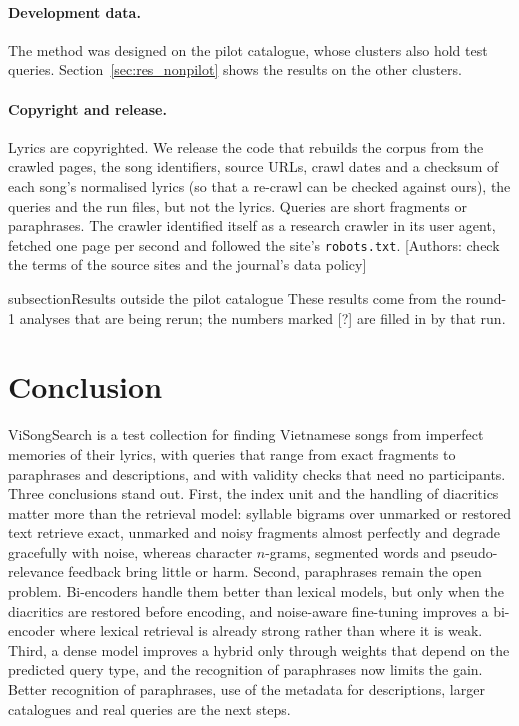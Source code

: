 \documentclass[11pt]{article}
\newcommand{\pending}[1]{\textcolor{pendingcolor}{\textsf{\small[#1]}}}
\newcommand{\authornote}[1]{\textcolor{blue!55!black}{\textsf{\small[Authors: #1]}}}
\begin{document}
\paragraph{Development data.} The method was designed on the pilot catalogue, whose clusters also hold test
queries. Section~\ref{sec:res_nonpilot} shows the results on the other clusters.

\paragraph{Copyright and release.} Lyrics are copyrighted. We release the code that rebuilds the corpus from
the crawled pages, the song identifiers, source URLs, crawl dates and a checksum of each song's normalised
lyrics (so that a re-crawl can be checked against ours), the queries and the run files, but not the lyrics.
Queries are short fragments or paraphrases. The crawler identified itself as a research crawler in its user
agent, fetched one page per second and followed the site's \texttt{robots.txt}. \authornote{check the terms of
the source sites and the journal's data policy}

subsection{Results outside the pilot catalogue}\label{sec:res_nonpilot}
These results come from the round-1 analyses that are being rerun; the numbers marked \pending{?} are filled in by that run.

\section{Conclusion}
ViSongSearch is a test collection for finding Vietnamese songs from imperfect memories of their lyrics, with
queries that range from exact fragments to paraphrases and descriptions, and with validity checks that need
no participants. Three conclusions stand out. First, the index unit and the handling of diacritics matter
more than the retrieval model: syllable bigrams over unmarked or restored text retrieve exact, unmarked and
noisy fragments almost perfectly and degrade gracefully with noise, whereas character $n$-grams, segmented
words and pseudo-relevance feedback bring little or harm. Second, paraphrases remain the open problem.
Bi-encoders handle them better than lexical models, but only when the diacritics are restored before
encoding, and noise-aware fine-tuning improves a bi-encoder where lexical retrieval is already strong rather
than where it is weak. Third, a dense model improves a hybrid only through weights that depend on the
predicted query type, and the recognition of paraphrases now limits the gain. Better recognition of
paraphrases, use of the metadata for descriptions, larger catalogues and real queries are the next steps.
\end{document}
